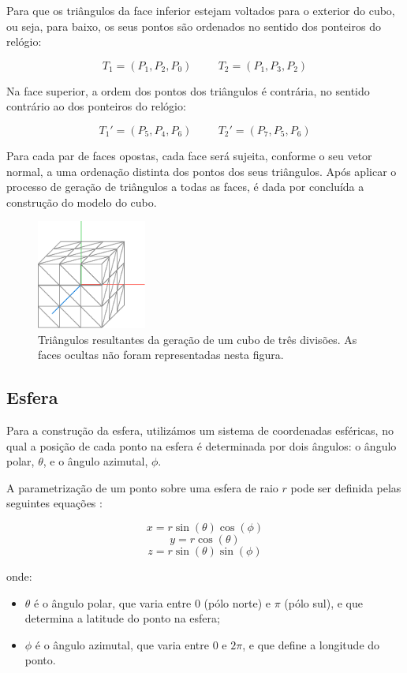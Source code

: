 \documentclass[12pt, a4paper]{article}
\begin{document}
Para que os triângulos da face inferior estejam voltados para o exterior do cubo, ou seja, para
baixo, os seus pontos são ordenados no sentido dos ponteiros do relógio:

$$
T_1 = (P_1, P_2, P_0)
\hspace{1cm}
T_2 = (P_1, P_3, P_2)
$$

Na face superior, a ordem dos pontos dos triângulos é contrária, no sentido contrário ao dos
ponteiros do relógio:

$$
T_1' = (P_5, P_4, P_6)
\hspace{1cm}
T_2' = (P_7, P_5, P_6)
$$

Para cada par de faces opostas, cada face será sujeita, conforme o seu vetor normal, a uma ordenação
distinta dos pontos dos seus triângulos. Após aplicar o processo de geração de triângulos a todas as
faces, é dada por concluída a construção do modelo do cubo.

\begin{figure}[H]
    \centering
    \includegraphics[width=0.32\textwidth]{res/figures/CubeTriangles.pdf}
    \caption{
        \onehalfspacing
        Triângulos resultantes da geração de um cubo de três divisões. As faces ocultas não foram
        representadas nesta figura.
    }
\end{figure}

\subsection{Esfera}

Para a construção da esfera, utilizámos um sistema de coordenadas esféricas, no qual a posição de
cada ponto na esfera é determinada por dois ângulos: o ângulo polar, $\theta$, e o ângulo azimutal,
$\phi$.

A parametrização de um ponto sobre uma esfera de raio \( r \) pode ser definida pelas seguintes
equações \cite{sphere}:

$$x = r \sin(\theta) \cos(\phi)$$
$$y = r \cos(\theta)$$
$$z = r \sin(\theta) \sin(\phi)$$

onde:
\begin{itemize}
    \item $\theta$ é o ângulo polar, que varia entre $0$ (pólo norte) e $\pi$ (pólo sul), e que
        determina a latitude do ponto na esfera;
    \item $\phi$ é o ângulo azimutal, que varia entre $0$ e $2\pi$, e que define a longitude do
        ponto.
\end{itemize}
\end{document}
